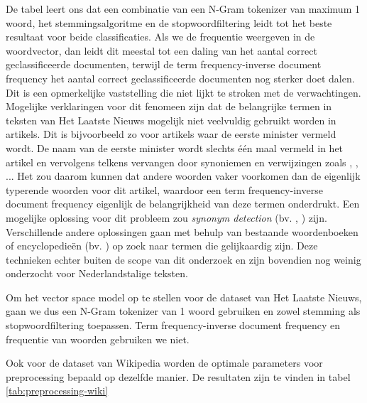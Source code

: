 De tabel leert ons dat een combinatie van een N-Gram tokenizer van maximum 1 woord, het stemmingsalgoritme en de stopwoordfiltering leidt tot het beste resultaat voor beide classificaties. Als we de frequentie weergeven in de woordvector, dan leidt dit meestal tot een daling van het aantal correct geclassificeerde documenten, terwijl de term frequency-inverse document frequency het aantal correct geclassificeerde documenten nog sterker doet dalen. Dit is een opmerkelijke vaststelling die niet lijkt te stroken met de verwachtingen. Mogelijke verklaringen voor dit fenomeen zijn dat de belangrijke termen in teksten van Het Laatste Nieuws mogelijk niet veelvuldig gebruikt worden in artikels. Dit is bijvoorbeeld zo voor artikels waar de eerste minister vermeld wordt. De naam van de eerste minister wordt slechts \'e\'en maal vermeld in het artikel en vervolgens telkens vervangen door synoniemen en verwijzingen zoals , , ... Het zou daarom kunnen dat andere woorden vaker voorkomen dan de eigenlijk typerende woorden voor dit artikel, waardoor een term frequency-inverse document frequency eigenlijk de belangrijkheid van deze termen onderdrukt. Een mogelijke oplossing voor dit probleem zou \textit{synonym detection} (bv. \cite{Zesch2008}, \cite{Weale2009}) zijn. Verschillende andere oplossingen gaan met behulp van bestaande woordenboeken of encyclopedie\"en (bv. \cite{Cheng2013}) op zoek naar termen die gelijkaardig zijn. Deze technieken echter buiten de scope van dit onderzoek en zijn bovendien nog weinig onderzocht voor Nederlandstalige teksten. 

Om het vector space model op te stellen voor de dataset van Het Laatste Nieuws, gaan we dus een N-Gram tokenizer van 1 woord gebruiken en zowel stemming als stopwoordfiltering toepassen. Term frequency-inverse document frequency en frequentie van woorden gebruiken we niet.

Ook voor de dataset van Wikipedia worden de optimale parameters voor preprocessing bepaald op dezelfde manier. De resultaten zijn te vinden in tabel \ref{tab:preprocessing-wiki}

